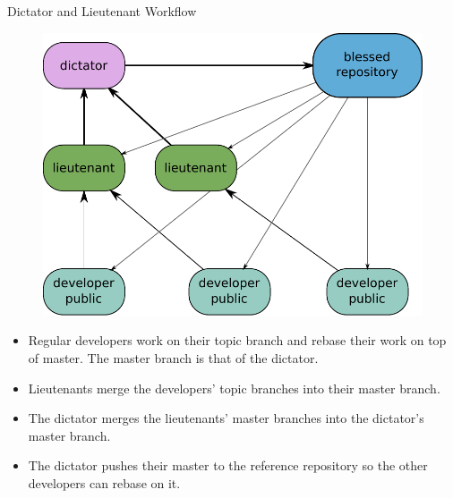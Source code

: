 \begin{frame}{Dictator and Lieutenant Workflow}
  \begin{figure} 
  \centering
    \includegraphics[scale=0.3]{images/dictator-and-lieteutnant-workflow.pdf}
  \end{figure}    
  \begin{itemize}
    \pause \item Regular developers work on their topic branch and rebase their work on top of master. The master branch is that of the dictator.
    \pause \item Lieutenants merge the developers’ topic branches into their master branch.
    \pause \item The dictator merges the lieutenants’ master branches into the dictator’s master branch.
    \pause \item The dictator pushes their master to the reference repository so the other developers can rebase on it.
  \end{itemize}
\end{frame}
